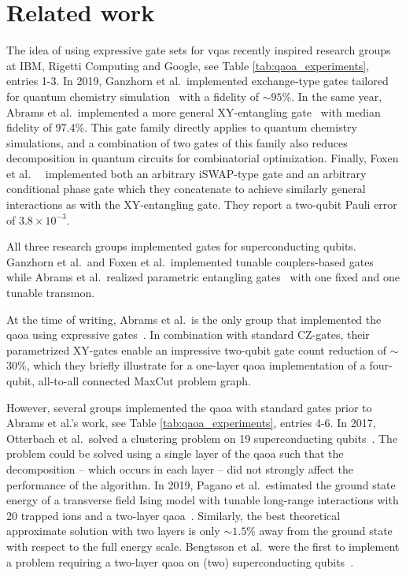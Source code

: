 \section{Related work}
The idea of using expressive gate sets for \glspl{vqa} recently inspired research groups at IBM, Rigetti Computing and Google, see Table \ref{tab:qaoa_experiments}, entries 1-3. In 2019, Ganzhorn et al.\ implemented exchange-type gates tailored for quantum chemistry simulation~\cite{Ganzhorn2019Gate-EfficientComputer} with a fidelity of $\sim95\%$. In the same year, Abrams et al.\ implemented a more general XY-entangling gate~\cite{Abrams2019ImplementationPulse} with median fidelity of 97.4\%. This gate family directly applies to quantum chemistry simulations, and a combination of two gates of this family also reduces decomposition in quantum circuits for combinatorial optimization. Finally, Foxen et al.\ ~\cite{Foxen2020DemonstratingAlgorithms} implemented both an arbitrary iSWAP-type gate and an arbitrary conditional phase gate which they concatenate to achieve similarly general interactions as with the XY-entangling gate. They report a two-qubit Pauli error of $3.8\times 10^{-3}$.

All three research groups implemented gates for superconducting qubits. Ganzhorn et al.\ and Foxen et al.\ implemented tunable couplers-based gates~\cite{McKay2016UniversalBus, Chen2014QubitCoupling} while Abrams et al.\ realized parametric entangling gates~\cite{Reagor2018DemonstrationLattice} with one fixed and one tunable transmon.

At the time of writing, Abrams et al.\ is the only group that implemented the \gls{qaoa} using expressive gates~\cite{Abrams2019ImplementationPulse}. In combination with standard CZ-gates, their parametrized XY-gates enable an impressive two-qubit gate count reduction of $\sim$30\%, which they briefly illustrate for a one-layer \gls{qaoa} implementation of a four-qubit, all-to-all connected MaxCut problem graph.

However, several groups implemented the \gls{qaoa} with standard gates prior to Abrams et al.'s work, see Table \ref{tab:qaoa_experiments}, entries 4-6. In 2017, Otterbach et al.\ solved a clustering problem on 19 superconducting qubits~\cite{Otterbach2017UnsupervisedComputer}. The problem could be solved using a single layer of the \gls{qaoa} such that the decomposition -- which occurs in each layer -- did not strongly affect the performance of the algorithm. In 2019, Pagano et al.\ estimated the ground state energy of a transverse field Ising model with tunable long-range interactions with 20 trapped ions and a two-layer \gls{qaoa}~\cite{Pagano2019QuantumSimulator}. Similarly, the best theoretical approximate solution with two layers is only $\sim1.5\%$ away from the ground state with respect to the full energy scale. Bengtsson et al.\ were the first to implement a problem requiring a two-layer \gls{qaoa} on (two) superconducting qubits~\cite{Bengtsson2019QuantumProcessor}. 

